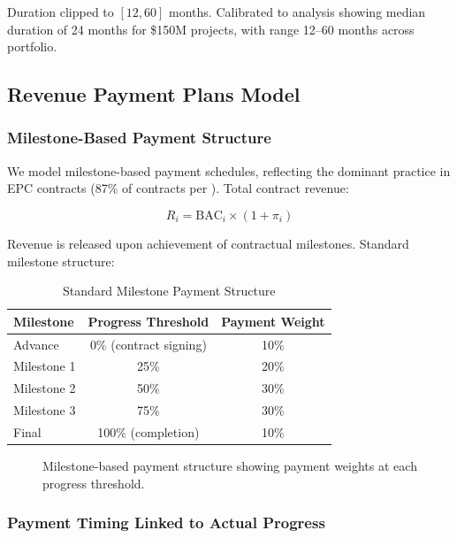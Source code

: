 Duration clipped to $[12, 60]$ months. Calibrated to \citet{merrow2011industrial} analysis showing median duration of 24 months for \$150M projects, with range 12--60 months across portfolio.

\subsection{Revenue Payment Plans Model}

\subsubsection{Milestone-Based Payment Structure}

We model milestone-based payment schedules, reflecting the dominant practice in EPC contracts (87\% of contracts per \citet{cui2010systems}). Total contract revenue:

\begin{equation}
R_i = \text{BAC}_i \times (1 + \pi_i)
\end{equation}

Revenue is released upon achievement of contractual milestones. Standard milestone structure:

\begin{table}[h]
\centering
\small
\caption{Standard Milestone Payment Structure}
\label{tab:milestones}
\begin{tabular}{@{}lcc@{}}
\toprule
Milestone & Progress Threshold & Payment Weight \\
\midrule
Advance & 0\% (contract signing) & 10\% \\
Milestone 1 & 25\% & 20\% \\
Milestone 2 & 50\% & 30\% \\
Milestone 3 & 75\% & 30\% \\
Final & 100\% (completion) & 10\% \\
\bottomrule
\end{tabular}
\end{table}

\begin{figure}[h]
\centering
\resizebox{0.9\columnwidth}{!}{}
\caption{Milestone-based payment structure showing payment weights at each progress threshold.}
\label{fig:milestone_structure}
\end{figure}

\subsubsection{Payment Timing Linked to Actual Progress}

